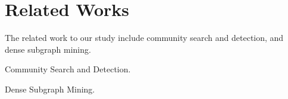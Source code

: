 \section{Related Works}
\label{relatedwork} 

The related work to our study include community search and detection, and dense subgraph mining.

Community Search and Detection.

Dense Subgraph Mining.